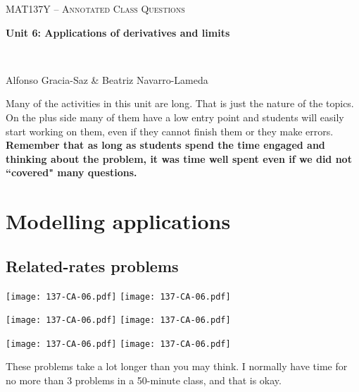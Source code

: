 \documentclass[11pt]{article}
\begin{document}
\thispagestyle{empty}
	\begin{center}
		{ {\LARGE  \scshape
		\textcolor{137cp3}{MAT137Y --   Annotated Class Questions}
		}
		
		\medskip
		{\bf \Large \textcolor{137cp1}{Unit 6: Applications of derivatives and limits
		}}
		
		\
		
		\medskip
		{\large
		\textcolor{137cp1}{Alfonso Gracia-Saz \& Beatriz Navarro-Lameda}
		}}
	\end{center}

\vspace{5mm}

Many of the activities in this unit are long.  That is just the nature of the topics.  On the plus side many of them have a low entry point and students will easily start working on them, even if they cannot finish them or they make errors.  \textbf{Remember that as long as students spend the time engaged and thinking about the problem, it was time  well spent even if we did not ``covered" many questions.}

\tableofcontents

\newpage

\section{Modelling applications}
\subsection{Related-rates problems} \label{relatedrates}

\begin{center}
{ \texttt{[image: 137-CA-06.pdf]}} \quad
{ \texttt{[image: 137-CA-06.pdf]}} 

\vspace{-2cm}

{ \texttt{[image: 137-CA-06.pdf]}} \quad
{ \texttt{[image: 137-CA-06.pdf]}} 

{ \texttt{[image: 137-CA-06.pdf]}} \quad
{ \texttt{[image: 137-CA-06.pdf]}} 

\vspace{-2cm}
\end{center}

\begin{warning}
		These problems take a lot longer than you may think. I normally have time for no more than 3 problems in a 50-minute class, and that is okay.
\end{warning}
\end{document}
